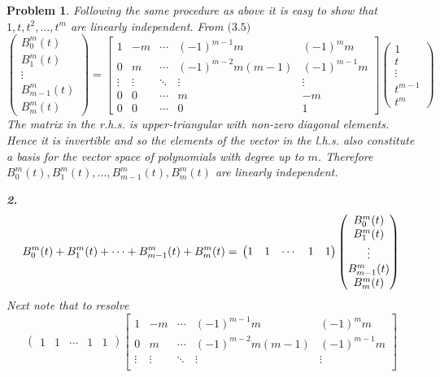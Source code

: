 \documentclass{article}
\newcommand{\subno}[1]{\par\noindent\textbf{#1}}
\theoremstyle{pprop}
\newtheorem{problem}{Problem}[section]
\begin{document}
\begin{problem}
Following the same procedure as above it is easy to show that $1,t,t^2,\ldots,t^m$ are linearly independent. From $\text{(3.5)}$
$$
\begin{pmatrix}
B_0^m(t) \\ B_1^m(t) \\ \vdots \\ B_{m-1}^m(t) \\ B_{m}^m(t)
\end{pmatrix}=
\begin{bmatrix}
1 & -m & \cdots & (-1)^{m-1}m & (-1)^{m}m\\ 
0 & m & \cdots &   (-1)^{m-2}m(m-1)&   (-1)^{m-1}m\\
\vdots & \vdots & \ddots & \vdots & \vdots\\ 
0  & 0 & \cdots &m &-m\\
0 & 0 & \cdots & 0 & 1
\end{bmatrix}
\begin{pmatrix}
1 \\ t \\ \vdots \\ t^{m-1}  \\ t^m
\end{pmatrix}
$$
The matrix in the r.h.s. is upper-triangular with non-zero diagonal elements. Hence it is invertible and so the elements of the 
vector in the l.h.s. also constitute a basis for the vector space of polynomials with degree up to $m$. 
Therefore $B_0^m(t) , B_1^m(t) , \ldots , B_{m-1}^m(t) , B_{m}^m(t)$ are linearly independent.
\subno{2.} $$
B_0^m(t) + B_1^m(t) + \cdots + B_{m-1}^m(t) + B_{m}^m(t)=\\
\begin{pmatrix} 1 & 1 & \cdots & 1 & 1 \end{pmatrix}
\begin{pmatrix}
B_0^m(t) \\ B_1^m(t) \\ \vdots \\ B_{m-1}^m(t) \\ B_{m}^m(t)
\end{pmatrix}
$$
Next note that to resolve
$$
\begin{pmatrix} 1 & 1 & \cdots & 1 & 1 \end{pmatrix}
\begin{bmatrix}
1 & -m & \cdots & (-1)^{m-1}m & (-1)^{m}m\\ 
0 & m & \cdots &   (-1)^{m-2}m(m-1)&   (-1)^{m-1}m\\
\vdots & \vdots & \ddots & \vdots & \vdots\\ 

\end{bmatrix}$$
\end{problem}
\end{document}
